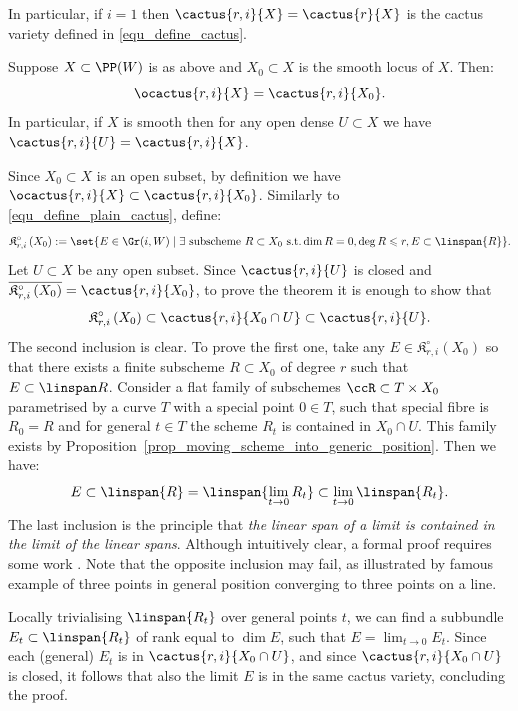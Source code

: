 \documentclass[12pt,a4paper]{article}
\newcommand{\cactusop}[2]{\mathfrak{K}^{\circ}_{#1}\left( #2 \right)}
\begin{document}
In particular, if $i=1$ then $\cactus{r,i}{X} = \cactus{r}{X}$ is the cactus variety defined in \eqref{equ_define_cactus}.


\begin{thm}
   \label{thm_generic_cactus_and_smooth_locus}
   Suppose $X\subset \PP (W)$ is as above and $X_0\subset X$ is the
   smooth locus of $X$. Then:
   \[
     \ocactus{r,i}{X} = \cactus{r,i}{X_0}.
   \]
   In particular,
   if $X$ is smooth then for any open dense
   $U\subset X$ we have $\cactus{r,i}{U} =\cactus{r,i}{X}$.
\end{thm}
\begin{prf}
   Since $X_0 \subset X$ is an open subset, by definition we have 
   $\ocactus{r,i}{X} \subset \cactus{r,i}{X_0}$.
   Similarly to \eqref{equ_define_plain_cactus}, define:
   \[
    \cactusop{r,i}{X_0} := \set{E\in \Gr(i, W) \mid
    \exists \text{ subscheme } R\subset X_0 \text{ s.t.} \dim R = 0, \deg R \leqslant r, E \subset \linspan{R} }.
   \]
   Let $U \subset X$ be any open subset.
   Since $\cactus{r,i}{U}$ is closed and $\overline{\cactusop{r,i}{X_0}} = \cactus{r,i}{X_0}$, to prove the theorem it is enough to show that
   \[
     \cactusop{r,i}{X_0} \subset \cactus{r,i}{X_0\cap U}\subset \cactus{r,i}{U}.
   \]
   The second inclusion is clear. 
   To prove the first one,
   take any $E\in \cactusop{r,i}{X_0}$ so that there exists a finite subscheme $R\subset X_0$ of degree $r$ such that $E\subset \linspan R$.
   Consider a flat family of subschemes $\ccR\subset T \times X_0$ parametrised by a curve $T$ with a special point $0\in T$, such that special fibre is $R_0 = R$ and for general $t\in T$ the scheme $R_t$ is contained in $X_0\cap U$.
   This family exists
      by Proposition~\ref{prop_moving_scheme_into_generic_position}.
   Then we have:
   \[
      E \subset \linspan{R} = \linspan{\lim_{t\to 0} R_t}
        \subset \lim_{t\to 0} \linspan{R_t}.
   \]
   The last inclusion is the principle that
   \emph{the linear span of a limit is contained in the limit of the linear spans}.
   Although intuitively clear,
     a formal proof requires some work
   \cite[Prop.~5.29]{jabu_jelisiejew_finite_schemes_and_secants}.
   Note that the opposite inclusion may fail, as illustrated by famous example of three points in general position converging to three points on a line.

   Locally trivialising $\linspan{R_t}$ over general points $t$, we can find a subbundle $E_t\subset \linspan{R_t}$ of rank equal to $\dim E$, such that $E= \lim_{t\to 0} E_t$.
   Since each (general) $E_t$ is in $\cactus{r,i}{X_0\cap U}$, and since $\cactus{r,i}{X_0\cap U}$ is closed, it follows that also the limit $E$ is in the same cactus variety, concluding the proof.
\end{prf}
\end{document}
